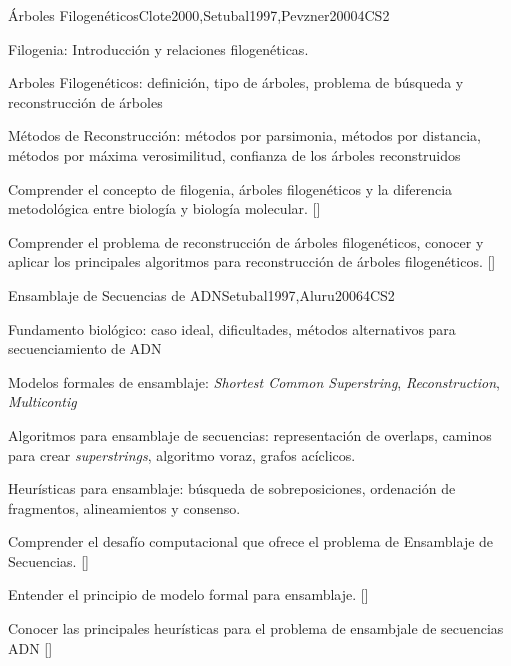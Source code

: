 \begin{syllabus}
\begin{unit}{Árboles Filogenéticos}{}{Clote2000,Setubal1997,Pevzner2000}{4}{CS2}
\begin{topics}
\item Filogenia: Introducción y relaciones filogenéticas.
\item Arboles Filogenéticos: definición, tipo de árboles, problema de búsqueda y reconstrucción de árboles
\item Métodos de Reconstrucción: métodos por parsimonia, métodos por distancia, métodos por máxima verosimilitud, confianza de los árboles reconstruidos
\end{topics}

\begin{learningoutcomes}
\item  Comprender el concepto de filogenia, árboles filogenéticos y la diferencia metodológica entre biología y biología molecular. [\Familiarity]
\item Comprender el problema de reconstrucción de árboles filogenéticos, conocer y aplicar los principales algoritmos para reconstrucción de árboles filogenéticos. [\Assessment]
\end{learningoutcomes}
\end{unit}

\begin{unit}{Ensamblaje de Secuencias de ADN}{}{Setubal1997,Aluru2006}{4}{CS2}
\begin{topics}
\item Fundamento biológico: caso ideal, dificultades, métodos alternativos para secuenciamiento de ADN
\item Modelos formales de ensamblaje: \textit{Shortest Common Superstring}, \textit{Reconstruction}, \textit{Multicontig}
\item Algoritmos para ensamblaje de secuencias: representación de overlaps, caminos para crear \textit{superstrings}, algoritmo voraz, grafos acíclicos.
\item Heurísticas para ensamblaje: búsqueda de sobreposiciones, ordenación de fragmentos, alineamientos y consenso.
\end{topics}

\begin{learningoutcomes}
\item Comprender el desafío computacional que ofrece el problema de Ensamblaje de Secuencias. [\Familiarity]
\item Entender el principio de modelo formal para ensamblaje. [\Assessment]
\item Conocer las principales heurísticas para el problema de ensambjale de secuencias ADN [\Usage]
\end{learningoutcomes}
\end{unit}


\end{syllabus}
